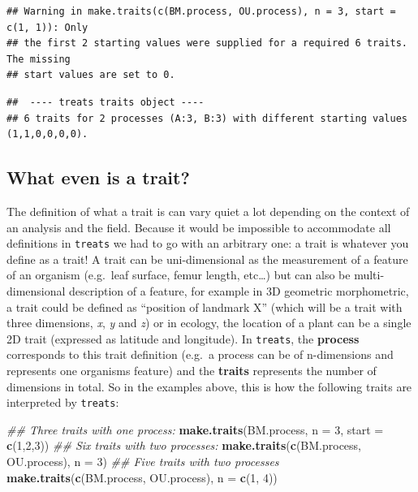 \documentclass[
]{book}
\newenvironment{Shaded}{\begin{snugshade}}{\end{snugshade}}
\newcommand{\CommentTok}[1]{\textcolor[rgb]{0.56,0.35,0.01}{\textit{#1}}}
\newcommand{\DataTypeTok}[1]{\textcolor[rgb]{0.13,0.29,0.53}{#1}}
\newcommand{\DecValTok}[1]{\textcolor[rgb]{0.00,0.00,0.81}{#1}}
\newcommand{\KeywordTok}[1]{\textcolor[rgb]{0.13,0.29,0.53}{\textbf{#1}}}
\newcommand{\NormalTok}[1]{#1}
\begin{document}
\begin{verbatim}
## Warning in make.traits(c(BM.process, OU.process), n = 3, start = c(1, 1)): Only
## the first 2 starting values were supplied for a required 6 traits. The missing
## start values are set to 0.
\end{verbatim}

\begin{verbatim}
##  ---- treats traits object ---- 
## 6 traits for 2 processes (A:3, B:3) with different starting values (1,1,0,0,0,0).
\end{verbatim}

\hypertarget{what-even-is-a-trait}{%
\subsection{What even is a trait?}\label{what-even-is-a-trait}}

The definition of what a trait is can vary quiet a lot depending on the context of an analysis and the field.
Because it would be impossible to accommodate all definitions in \texttt{treats} we had to go with an arbitrary one: a trait is whatever you define as a trait!
A trait can be uni-dimensional as the measurement of a feature of an organism (e.g.~leaf surface, femur length, etc\ldots) but can also be multi-dimensional description of a feature, for example in 3D geometric morphometric, a trait could be defined as ``position of landmark X'' (which will be a trait with three dimensions, \emph{x}, \emph{y} and \emph{z}) or in ecology, the location of a plant can be a single 2D trait (expressed as latitude and longitude).
In \texttt{treats}, the \textbf{process} corresponds to this trait definition (e.g.~a process can be of n-dimensions and represents one organisms feature) and the \textbf{traits} represents the number of dimensions in total.
So in the examples above, this is how the following traits are interpreted by \texttt{treats}:

\begin{Shaded}
\begin{Highlighting}[]
\CommentTok{\#\# Three traits with one process:}
\KeywordTok{make.traits}\NormalTok{(BM.process, }\DataTypeTok{n =} \DecValTok{3}\NormalTok{, }\DataTypeTok{start =} \KeywordTok{c}\NormalTok{(}\DecValTok{1}\NormalTok{,}\DecValTok{2}\NormalTok{,}\DecValTok{3}\NormalTok{))}
\CommentTok{\#\# Six traits with two processes:}
\KeywordTok{make.traits}\NormalTok{(}\KeywordTok{c}\NormalTok{(BM.process, OU.process), }\DataTypeTok{n =} \DecValTok{3}\NormalTok{)}
\CommentTok{\#\# Five traits with two processes}
\KeywordTok{make.traits}\NormalTok{(}\KeywordTok{c}\NormalTok{(BM.process, OU.process), }\DataTypeTok{n =} \KeywordTok{c}\NormalTok{(}\DecValTok{1}\NormalTok{, }\DecValTok{4}\NormalTok{))}
\end{Highlighting}
\end{Shaded}
\end{document}
